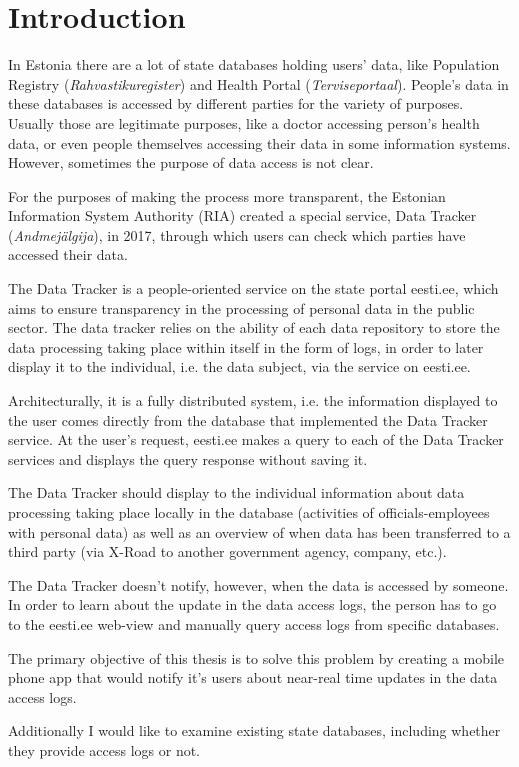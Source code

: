 \section{Introduction} \label{Introduction}

In Estonia there are a lot of state databases holding users' data, like Population Registry (\textit{Rahvastikuregister}) and Health Portal (\textit{Terviseportaal}). People's data in these databases is accessed by different parties for the variety of purposes. Usually those are legitimate purposes, like a doctor accessing person's health data, or even people themselves accessing their data in some information systems. However, sometimes the purpose of data access is not clear.

For the purposes of making the process more transparent, the Estonian Information System Authority (RIA) created a special service, Data Tracker (\textit{Andmejälgija}), in 2017, through which users can check which parties have accessed their data. \cite{err-population-registry-unauthorized-access}

The Data Tracker is a people-oriented service on the state portal eesti.ee, which aims to ensure transparency in the processing of personal data in the public sector. The data tracker relies on the ability of each data repository to store the data processing taking place within itself in the form of logs, in order to later display it to the individual, i.e. the data subject, via the service on eesti.ee.\cite{aj-github}

Architecturally, it is a fully distributed system, i.e. the information displayed to the user comes directly from the database that implemented the Data Tracker service. At the user's request, eesti.ee makes a query to each of the Data Tracker services and displays the query response without saving it.\cite{aj-github}

The Data Tracker should display to the individual information about data processing taking place locally in the database (activities of officials-employees with personal data) as well as an overview of when data has been transferred to a third party (via X-Road to another government agency, company, etc.).\cite{aj-github}

The Data Tracker doesn't notify, however, when the data is accessed by someone. In order to learn about the update in the data access logs, the person has to go to the eesti.ee web-view and manually query access logs from specific databases. 

The primary objective of this thesis is to solve this problem by creating a mobile phone app that would notify it's users about near-real time updates in the data access logs. 

Additionally I would like to examine existing state databases, including whether they provide access logs or not.